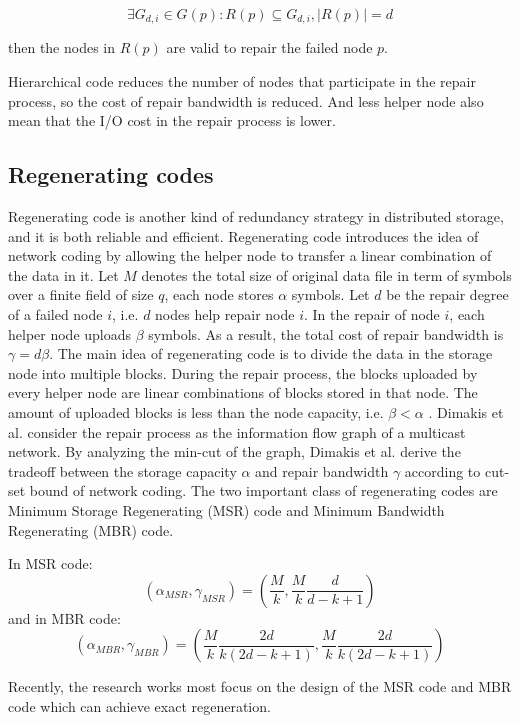 \documentclass{article} %
\begin{document}
$$\exists G_{d, i} \in G(p) : R(p) \subseteq G_{d, i}, |R(p)| = d$$

then the nodes in $R(p)$ are valid to repair the failed node $p$.

Hierarchical code reduces the number of nodes that participate in the repair process, so the cost of repair bandwidth is reduced. And less helper node also mean that the I/O cost in the repair process is lower.

\subsection{Regenerating codes}
Regenerating code is another kind of redundancy strategy in distributed storage, and it is both reliable and efficient. Regenerating code introduces the idea of network coding by allowing the helper node to transfer a linear combination of the data in it. Let $M$ denotes the total size of original data file in term of symbols over a finite field of size $q$, each node stores $\alpha$ symbols. Let $d$ be the repair degree of a failed node $i$, i.e. $d$ nodes help repair node $i$. In the repair of node $i$, each helper node uploads $\beta$ symbols. As a result, the total cost of repair bandwidth is $\gamma = d\beta$. The main idea of regenerating code is to divide the data in the storage node into multiple blocks. During the repair process, the blocks uploaded by every helper node are linear combinations of blocks stored in that node. The amount of uploaded blocks is less than the node capacity, i.e. $\beta < \alpha$ .  Dimakis et al. consider the repair process as the information flow graph of a multicast network. By analyzing the min-cut of the graph, Dimakis et al. derive the tradeoff between the storage capacity $\alpha$  and repair bandwidth $\gamma$  according to cut-set bound of network coding. The two important class of regenerating codes are Minimum Storage Regenerating (MSR) code and Minimum Bandwidth Regenerating (MBR) code.

In MSR code:
\begin{equation}
(\alpha_{MSR}, \gamma_{MSR}) = ( \frac{M}{k}, \frac{M}{k} \frac{d}{d-k+1})
\end{equation}
and in MBR code:
\begin{equation}
(\alpha_{MBR}, \gamma_{MBR}) = ( \frac{M}{k}\frac{2d}{k(2d - k + 1)}, \frac{M}{k} \frac{2d}{k(2d-k+1)})
\end{equation}

Recently, the research works most focus on the design of the MSR code and MBR code which can achieve exact regeneration.
\end{document}
